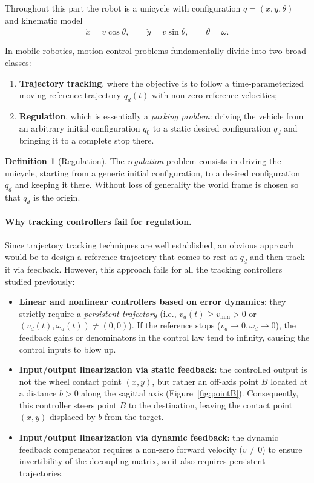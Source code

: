 \documentclass[11pt,a4paper]{article}
\def\bm#1{#1}%
\theoremstyle{definition}
\newtheorem{definition}{Definition}[section]
\theoremstyle{plain}
\theoremstyle{remark}
\begin{document}
Throughout this part the robot is a unicycle with configuration $\bm q=(x,y,\theta)$ and kinematic model
\[
\dot x=v\cos\theta,\qquad \dot y=v\sin\theta,\qquad \dot\theta=\omega .
\]

In mobile robotics, motion control problems fundamentally divide into two broad classes:
\begin{enumerate}[leftmargin=*,nosep]
\item \textbf{Trajectory tracking}, where the objective is to follow a time-parameterized moving reference trajectory $\bm q_d(t)$ with non-zero reference velocities;
\item \textbf{Regulation}, which is essentially a \emph{parking problem}: driving the vehicle from an arbitrary initial configuration $\bm q_0$ to a static desired configuration $\bm q_d$ and bringing it to a complete stop there.
\end{enumerate}

\begin{definition}[Regulation]
The \emph{regulation} problem consists in driving the unicycle, starting from a generic initial configuration, to a desired configuration $\bm q_d$ and keeping it there. Without loss of generality the world frame is chosen so that $\bm q_d$ is the origin.
\end{definition}

\paragraph{Why tracking controllers fail for regulation.}
Since trajectory tracking techniques are well established, an obvious approach would be to design a reference trajectory that comes to rest at $\bm q_d$ and then track it via feedback. However, this approach fails for all the tracking controllers studied previously:
\begin{itemize}[leftmargin=*]
\item \textbf{Linear and nonlinear controllers based on error dynamics}: they strictly require a \emph{persistent trajectory} (i.e., $v_d(t) \ge v_{\min} > 0$ or $(v_d(t),\omega_d(t))\neq(0,0)$). If the reference stops ($v_d \to 0, \omega_d \to 0$), the feedback gains or denominators in the control law tend to infinity, causing the control inputs to blow up.
\item \textbf{Input/output linearization via static feedback}: the controlled output is not the wheel contact point $(x,y)$, but rather an off-axis point $B$ located at a distance $b>0$ along the sagittal axis (Figure~\ref{fig:pointB}). Consequently, this controller steers point $B$ to the destination, leaving the contact point $(x,y)$ displaced by $b$ from the target.
\item \textbf{Input/output linearization via dynamic feedback}: the dynamic feedback compensator requires a non-zero forward velocity ($v \ne 0$) to ensure invertibility of the decoupling matrix, so it also requires persistent trajectories.
\end{itemize}
\end{document}
